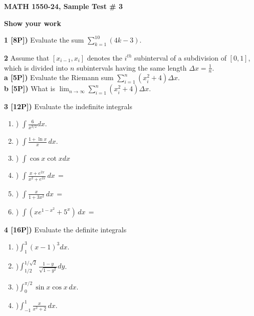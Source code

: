\documentclass[12pt]{article}
\begin{document}
\centerline{\bf MATH 1550-24, Sample Test \# 3}%
\centerline{\bf Show your work}

\vspace{.25in}

{\bf 1 [8P])} Evaluate the sum ${\displaystyle \sum_{k=1}^{10}\left(4 k - 3\right)}$.  

\vspace{.5in}

{\bf 2} Assume that ${\displaystyle [x_{i-1},x_i]}$ denotes the
$i^{th}$ subinterval of a subdivision of $[0,1]$,
which is divided into $n$ subintervals having the same length ${\displaystyle
\Delta x = \frac{1}{n}}$. \\
{\bf a [5P])} Evaluate the Riemann sum ${\displaystyle
\sum_{i=1}^n \left(x_i^2 + 4\right)\Delta x}$.\\

{\bf b [5P])} What is ${\displaystyle
\lim_{n\to \infty}
\sum_{i=1}^n \left(x_i^2 + 4\right)\Delta x}$.

\vspace{.5in}

{\bf 3 [12P])} Evaluate the indefinite integrals
\begin{enumerate}
\item )\; ${\displaystyle \int \frac{6}{x^{3/2}}dx}$.
\item )\; ${\displaystyle \int \frac{1 + \ln x}{x}\, dx}$.
\item )\; ${\displaystyle \int  \cos x\cot x dx} $
\item )\; ${\displaystyle \int \frac{x + e^{2x}}{x^2+e^{2x}}\, dx \, = }$
\item )\; ${\displaystyle \int \frac{x}{1 + 3x^2}\, dx \, = }$
\item )\; ${\displaystyle \int \left( xe^{1-x^2} + 5^x\right)\, dx \, = }$
\end{enumerate}


\newpage

{\bf 4 [16P])} Evaluate the definite integrals
\begin{enumerate}
\item )\;${\displaystyle \int_1^3 \left( x - 1\right)^3 dx}$.
\item )\;${\displaystyle \int^{1/{\sqrt{2}}}_{1/2} \frac{1-y}{\sqrt{1-y^2}} dy}$.
\item )\;${\displaystyle \int_0^{\pi / 2} \sin x \cos x\, dx}$.
\item )\;${\displaystyle \int_{-1}^1 \frac{x}{x^2 + 2} \, dx }$.
\end{enumerate}
\end{document}
